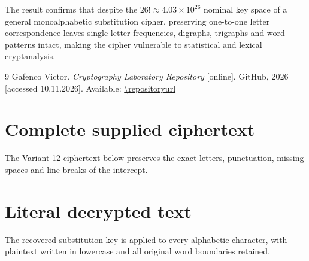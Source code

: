 \documentclass{utmreport}
\begin{document}
The result confirms that despite the $26!\approx4.03\times10^{26}$ nominal key space of a general monoalphabetic substitution cipher, preserving one-to-one letter correspondence leaves single-letter frequencies, digraphs, trigraphs and word patterns intact, making the cipher vulnerable to statistical and lexical cryptanalysis.

\begin{thebibliography}{9}
 Gafenco Victor. \textit{Cryptography Laboratory Repository} [online]. GitHub, 2026 [accessed 10.11.2026]. Available: \url{\repositoryurl}
\end{thebibliography}

\appendix
\chapter{Complete supplied ciphertext}\label{app:cipher}
The Variant 12 ciphertext below preserves the exact letters, punctuation, missing spaces and line breaks of the intercept.

\chapter{Literal decrypted text}\label{app:plain}
The recovered substitution key is applied to every alphabetic character, with plaintext written in lowercase and all original word boundaries retained.

\end{document}
